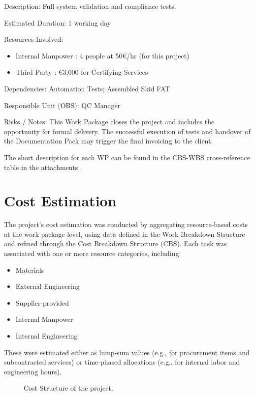 \begin{tcolorbox}[boxstyle2, title=Final Tests]
Description:
Full system validation and compliance tests.

Estimated Duration: 1 working day

Resources Involved:
\begin{itemize}
    \item  Internal Manpower : 4 people at 50€/hr (for this project)
    \item  Third Party : €3,000 for Certifying Services

\end{itemize}

Dependencies:
Automation Tests; Assembled Skid FAT

Responsible Unit (OBS): QC Manager

Risks / Notes:
This Work Package closes the project and includes the opportunity for formal delivery. The successful execution of tests and handover of the Documentation Pack may trigger the final invoicing to the client.
\end{tcolorbox}

The short description for each WP can be found in the CBS-WBS cross-reference table in the attachments \cite{CostEstimation}.

\section{Cost Estimation}

The project’s cost estimation was conducted by aggregating resource-based costs at the work package level, using data defined in the Work Breakdown Structure and refined through the Cost Breakdown Structure (CBS). Each task was associated with one or more resource categories, including:
\begin{itemize}
    \item Materials
    \item External Engineering
    \item Supplier-provided
    \item Internal Manpower
    \item Internal Engineering
\end{itemize}


These were estimated either as lump-sum values (e.g., for procurement items and subcontracted services) or time-phased allocations (e.g., for internal labor and engineering hours).

\begin{figure}[p]
    \centering
    \caption{Cost Structure of the project.}
    \label{fig:CS}
\end{figure}

